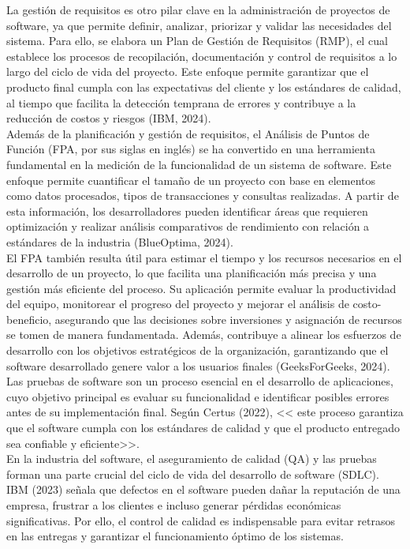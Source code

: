 \documentclass[12pt,letterpaper,spanish, xcolor=table]{report}
\numberwithin{figure}{subsection}
\begin{document}
La gestión de requisitos es otro pilar clave en la administración de proyectos de software, ya que permite definir, analizar, priorizar y validar las necesidades del sistema. Para ello, se elabora un Plan de Gestión de Requisitos (RMP), el cual establece los procesos de recopilación, documentación y control de requisitos a lo largo del ciclo de vida del proyecto. Este enfoque permite garantizar que el producto final cumpla con las expectativas del cliente y los estándares de calidad, al tiempo que facilita la detección temprana de errores y contribuye a la reducción de costos y riesgos (IBM, 2024).\\

Además de la planificación y gestión de requisitos, el Análisis de Puntos de Función (FPA, por sus siglas en inglés) se ha convertido en una herramienta fundamental en la medición de la funcionalidad de un sistema de software. Este enfoque permite cuantificar el tamaño de un proyecto con base en elementos como datos procesados, tipos de transacciones y consultas realizadas. A partir de esta información, los desarrolladores pueden identificar áreas que requieren optimización y realizar análisis comparativos de rendimiento con relación a estándares de la industria (BlueOptima, 2024).\\

El FPA también resulta útil para estimar el tiempo y los recursos necesarios en el desarrollo de un proyecto, lo que facilita una planificación más precisa y una gestión más eficiente del proceso. Su aplicación permite evaluar la productividad del equipo, monitorear el progreso del proyecto y mejorar el análisis de costo-beneficio, asegurando que las decisiones sobre inversiones y asignación de recursos se tomen de manera fundamentada. Además, contribuye a alinear los esfuerzos de desarrollo con los objetivos estratégicos de la organización, garantizando que el software desarrollado genere valor a los usuarios finales (GeeksForGeeks, 2024).\\


Las pruebas de software son un proceso esencial en el desarrollo de aplicaciones, cuyo objetivo principal es evaluar su funcionalidad e identificar posibles errores antes de su implementación final. Según Certus (2022), << este proceso garantiza que el software cumpla con los estándares de calidad y que el producto entregado sea confiable y eficiente>>.\\

En la industria del software, el aseguramiento de calidad (QA) y las pruebas forman una parte crucial del ciclo de vida del desarrollo de software (SDLC). IBM (2023) señala que defectos en el software pueden dañar la reputación de una empresa, frustrar a los clientes e incluso generar pérdidas económicas significativas. Por ello, el control de calidad es indispensable para evitar retrasos en las entregas y garantizar el funcionamiento óptimo de los sistemas.\\
\end{document}
